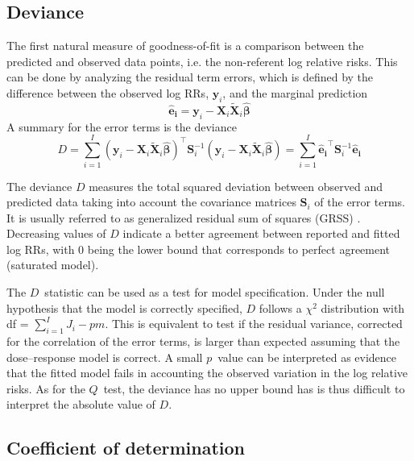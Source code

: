\documentclass[11pt,a4paper,twoside,openany]{book}\usepackage{knitr}
\begin{document}
{\subsection{Deviance} 

The first natural measure of goodness-of-fit is a comparison between the predicted and observed data points, i.e. the non-referent log relative risks. This can be done by analyzing the residual term errors, which is defined by the difference between the observed log RRs, $\mathbf{y}_i$, and the marginal prediction
\begin{equation}
\boldsymbol{\hat e_i} = \mathbf{y}_i - \mathbf{X}_i \widetilde{\mathbf{X}}_i \boldsymbol{\hat \beta}
\label{eq:residual}
\end{equation}\noindent A summary for the error terms is the deviance
\begin{equation}
D = \sum_{i=1}^I \left(\mathbf{y}_i - \mathbf{X}_i \widetilde{\mathbf{X}}_i \boldsymbol{\hat \beta} \right)^\top \mathbf{S}_i^{-1} \left(\mathbf{y}_i -\mathbf{X}_i \widetilde{\mathbf{X}}_i \boldsymbol{\hat \beta} \right) = \sum_{i=1}^I \boldsymbol{\hat e_i}^\top \mathbf{S}_i^{-1} \boldsymbol{\hat e_i}
\label{eq:deviance}
\end{equation}

\noindent The deviance $D$ measures the total squared deviation between observed and predicted data taking into account the covariance matrices $\mathbf{S}_i$ of the error terms. It is usually referred to as generalized residual sum of squares (GRSS) \citep{draper2014applied}. Decreasing values of $D$ indicate a better agreement between reported and fitted log RRs, with 0 being the lower bound that corresponds to perfect agreement (saturated model).

\noindent The $D$~statistic can be used as a test for model specification. Under the null hypothesis that the model is correctly specified, $D$ follows a $\chi^2$ distribution with df = $\sum_{i=1}^I J_i - pm$. This is equivalent to test if the residual variance, corrected for the correlation of the error terms, is larger than expected assuming that the dose--response model is correct. A small $p$~value can be interpreted as evidence that the fitted model fails in accounting the observed variation in the log relative risks. As for the $Q$~test, the deviance has no upper bound has is thus difficult to interpret the absolute value of $D$.

\subsection{Coefficient of determination}

}
\end{document}
